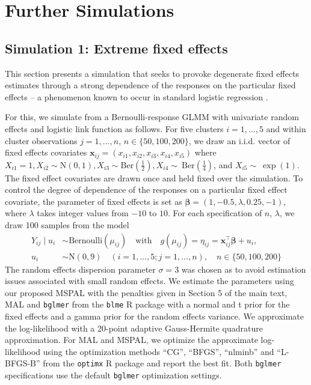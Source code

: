 \documentclass[11pt, a4paper]{article}
\newcommand*{\bb}{\boldsymbol}
\theoremstyle{example} \newtheorem{example}{Example}[section]
\theoremstyle{theorem} \newtheorem{theorem}{Theorem}[section]
\theoremstyle{theorem }\newtheorem{proposition}{Proposition}[section]
\theoremstyle{theorem }\newtheorem{corollary}{Corollary}[section]
\def\\bbeta{\bb{\\bbeta}}
\def\bx{\bb{x}}
\begin{document}
\section{Further Simulations} \label{sec:simuls}

\subsection{Simulation 1: Extreme fixed effects}\label{sec:sim1}

This section presents a simulation that seeks to provoke degenerate fixed effects estimates through a strong dependence of the responses on the particular fixed effects -- a phenomenon known to occur in standard logistic regression \citep{albert+anderson:1984,kosmidis+firth:2020}.

For this, we simulate from a Bernoulli-response GLMM with univariate random effects and logistic link function as follows. For five clusters $i=1,\ldots,5$ and within cluster observations $j=1,\ldots,n$, $n \in \{50,100,200\}$, we draw an i.i.d. vector of fixed effects covariates $\bx_{ij} = (x_{i1},x_{i2},x_{i3},x_{i4},x_{i5})$ where $X_{i1}=1, {X}_{i2} \sim \text{N}(0,1), {X}_{i3}\sim \textrm{Ber}\left(\frac{1}{2}\right), {X}_{i4}\sim~\textrm{Ber}\left(\frac{1}{4}\right)$, and ${X}_{i5}\sim~\exp(1)$. The fixed effect covariates are drawn once and held fixed over the simulation. To control the degree of dependence of the responses on a particular fixed effect covariate, the parameter of fixed effects is set as $\bb \beta=(1,-0.5,\lambda,0.25,-1)$, where $\lambda$ takes integer values from $-10$ to $10$. For each specification of $n$, $\lambda$, we draw 100 samples from the model 
\begin{equation}
	\begin{aligned}
		\label{eq:sim1_model} 
		Y_{ij} \mid {u}_i & \sim \text{Bernoulli}(\mu_{ij}) \quad \text{with} \quad
		g(\mu_{ij}) = \eta_{ij} = \bx_{ij}^\top \bb \beta + u_i,\\
		u_i & \sim \text{N}(0, 9)  \quad (i = 1, \ldots, 5; j = 1, \ldots, n), \quad n\in \{50,100,200\}
	\end{aligned}
\end{equation}
The random effects dispersion parameter $\sigma = 3$ was chosen as to avoid estimation issues associated with small random effects. We estimate the parameters using our proposed MSPAL with the penalties given in Section 5 of the main text, MAL and \texttt{bglmer}  from the \texttt{blme} R package \citep{chung+etal:2013} with a normal and t prior for the fixed effects and a gamma prior for the random effects variance. We approximate the log-likelihood with a 20-point adaptive Gauss-Hermite quadrature approximation. For MAL and MSPAL, we optimize the approximate log-likelihood using the optimization methods ``CG'', ``BFGS'', ``nlminb'' and ``L-BFGS-B'' from the \texttt{optimx} R package \citep{nash+varadhan:2011} and report the best fit. Both \texttt{bglmer} specifications use the default \texttt{bglmer} optimization settings. 
\end{document}
